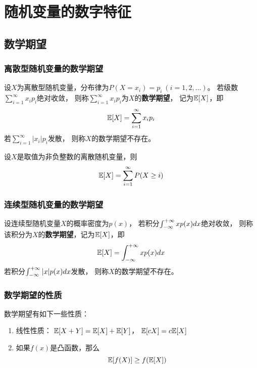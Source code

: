 \chapter{随机变量的数字特征}

\section{数学期望}

\subsection{离散型随机变量的数学期望}
\begin{definition}[离散型随机变量的数学期望]
  设$X$为离散型随机变量，分布律为$P(X=x_i)=p_i\ (i=1,2,\dots)$。
  若级数$\sum_{i=1}^{\infty}x_ip_i$绝对收敛，
  则称$\sum_{i=1}^{\infty}x_ip_i$为$X$的\textbf{数学期望}，
  记为$\mathbb{E}[X]$，即
  \begin{displaymath}
    \mathbb{E}[X] = \sum_{i=1}^{\infty}x_ip_i
  \end{displaymath}
  若$\sum_{i=1}^{\infty}|x_i|p_i$发散，
  则称$X$的数学期望不存在。
\end{definition}

\begin{theorem}[离散非负随机变量的期望的其它计算方法]
  设$X$是取值为非负整数的离散随机变量，则
  \begin{displaymath}
    \mathbb{E}[X] = \sum_{i=1}^{\infty} P(X\ge i)
  \end{displaymath}
\end{theorem}

\subsection{连续型随机变量的数学期望}
\begin{definition}[连续型随机变量的数学期望]
  设连续型随机变量$X$的概率密度为$p(x)$，
  若积分$\int_{-\infty}^{+\infty} xp(x)dx$绝对收敛，
  则称该积分为$X$的\textbf{数学期望}，记为$\mathbb{E}[X]$，即
  \begin{displaymath}
    \mathbb{E}[X] = \int_{-\infty}^{+\infty} xp(x)dx
  \end{displaymath}
  若积分$\int_{-\infty}^{+\infty} |x|p(x)dx$发散，
  则称$X$的数学期望不存在。
\end{definition}

\subsection{数学期望的性质}
\begin{theorem}[数学期望的性质]
  数学期望有如下一些性质：
  \begin{enumerate}
    \item 线性性质：
    $\mathbb{E}[X+Y] = \mathbb{E}[X] + \mathbb{E}[Y]$，
    $\mathbb{E}[cX] = c\mathbb{E}[X]$
    \item
    如果$f(x)$是凸函数，那么
    \begin{displaymath}
      \mathbb{E}[f(X)] \ge f(\mathbb{E}[X])
    \end{displaymath}
  \end{enumerate}
\end{theorem}

